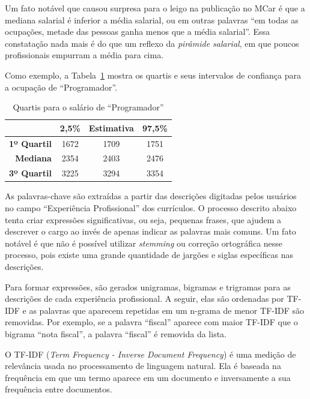 \documentclass[12pt,a4paper]{article}
\begin{document}
Um fato notável que causou surpresa para o leigo na publicação no MCar é que a mediana salarial é inferior a média salarial, ou em outras palavras \enquote{em todas as ocupações, metade das pessoas ganha menos que a média salarial}. Essa constatação nada mais é do que um reflexo da \textit{pirâmide salarial}, em que poucos profissionais empurram a média para cima.

Como exemplo, a Tabela~\ref{tab:resumo-salario-programador} mostra os quartis e seus intervalos de confiança para a ocupação de \enquote{Programador}.

\begin{table}[htb]
    \centering
    \begin{tabular}{r|c|c|c}
        & \textbf{2,5\%} & \textbf{Estimativa} & \textbf{97,5\%} \\ \hline
        \textbf{1º Quartil} & 1672           & 1709                & 1751 \\ \hline
        \textbf{Mediana}    & 2354           & 2403                & 2476 \\ \hline
        \textbf{3º Quartil} & 3225           & 3294                & 3354 \\
    \end{tabular}
    \caption{Quartis para o salário de \enquote{Programador}}
    \label{tab:resumo-salario-programador}
\end{table}

As palavras-chave são extraídas a partir das descrições digitadas pelos usuários no campo \enquote{Experiência Profissional} dos currículos. O processo descrito abaixo tenta criar expressões significativas, ou seja, pequenas frases, que ajudem a descrever o cargo ao invés de apenas indicar as palavras mais comuns. Um fato notável é que não é possível utilizar \textit{stemming} ou correção ortográfica nesse processo, pois existe uma grande quantidade de jargões e siglas específicas nas descrições.

Para formar expressões, são gerados unigramas, bigramas e trigramas para as descrições de cada experiência profissional. A seguir, elas são ordenadas por TF-IDF e as palavras que aparecem repetidas em um n-grama de menor TF-IDF são removidas. Por exemplo, se a palavra \enquote{fiscal} aparece com maior TF-IDF que o bigrama \enquote{nota fiscal}, a palavra \enquote{fiscal} é removida da lista.

O TF-IDF (\textit{Term Frequency - Inverse Document Frequency}) é uma medição de relevância usada no processamento de linguagem natural. Ela é baseada na frequência em que um termo aparece em um documento e inversamente a sua frequência entre documentos.
\end{document}
